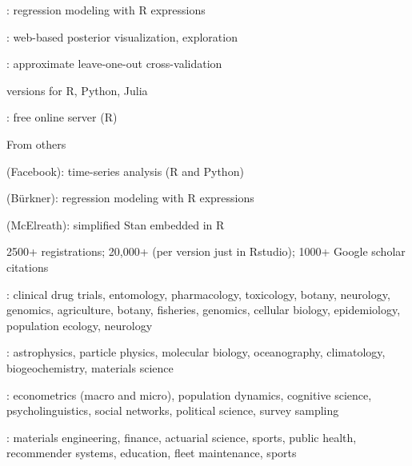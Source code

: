 \documentclass[10pt]{report}
\begin{document}
%
\begin{subitemize}
\item {}
\begin{subsubitemize}
 \item {}: regression modeling with R expressions
 \item {}: web-based posterior visualization, exploration
 \item {}:  approximate leave-one-out cross-validation
\end{subsubitemize}
\item {}
\begin{subsubitemize}
\item {} versions for R, Python, Julia
\item {}: free online server (R)
\end{subsubitemize}
\item From others
\begin{subsubitemize}
\item {} (Facebook): time-series analysis (R and Python)
\item {} (B\"urkner): regression modeling with R expressions
\item {} (McElreath): simplified Stan embedded in R
\end{subsubitemize}
\end{subitemize}


%
\begin{subitemize}
\item 2500+  registrations;  20,000+ 
  \small{(per version just in Rstudio)}; 1000+ Google scholar citations
\item {}: {\footnotesize
clinical drug trials, entomology, pharmacology, toxicology, botany,
neurology, genomics, agriculture, botany, fisheries, genomics, cellular
biology, epidemiology, population ecology, neurology
}
\item {}: {\footnotesize
astrophysics, particle physics, molecular biology, oceanography, climatology, biogeochemistry, materials science
}
\item {}: {\footnotesize
 econometrics (macro and micro), population dynamics, cognitive
 science, psycholinguistics, social networks, political science,
 survey sampling
}
\item {}: {\footnotesize materials engineering, finance,
    actuarial science, sports, public health, recommender systems,
    education, fleet maintenance, sports}
\end{subitemize}
\end{document}
